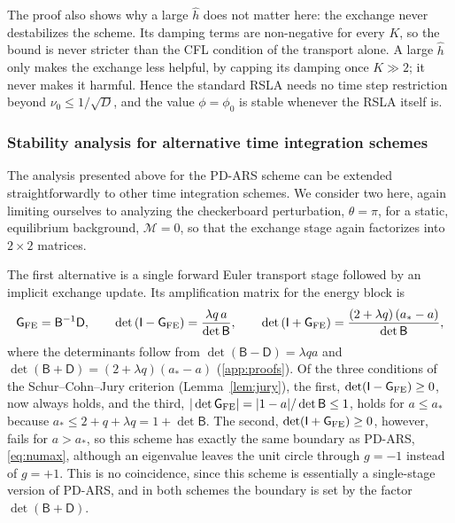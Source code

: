 \documentclass[preprint,12pt,authoryear]{elsarticle}
\newcommand{\tenI}{\mathsf{I}}
\newcommand{\tenG}{\mathsf{G}}
\providecommand{\tenD}{\mathsf{D}}
\providecommand{\tenB}{\mathsf{B}}
\newcommand{\calM}{\mathcal{M}}
\begin{document}
The proof also shows why a large $\hat{h}$ does not matter here: the exchange never destabilizes the scheme. Its damping terms are non-negative for every $K$, so the bound is never stricter than the CFL condition of the transport alone. A large $\hat{h}$ only makes the exchange less helpful, by capping its damping once $K \gg 2$; it never makes it harmful. Hence the standard RSLA needs no time step restriction beyond $\nu_0 \leq 1/\sqrt{D}$, and the value $\phi = \phi_0$ is stable whenever the RSLA itself is.

\subsubsection{Stability analysis for alternative time integration schemes}
\label{sssec:other_schemes}

The analysis presented above for the PD-ARS scheme can be extended straightforwardly to other time integration schemes. We consider two here, again limiting ourselves to analyzing the checkerboard perturbation, $\theta=\pi$, for a static, equilibrium background, $\calM = 0$, so that the exchange stage again factorizes into $2\times2$ matrices.

The first alternative is a single forward Euler transport stage followed by an implicit exchange update. Its amplification matrix for the energy block is
\begin{equation}
    \tenG_{\rm FE} = \tenB^{-1}\tenD,
    \qquad
    \det\left(\tenI - \tenG_{\rm FE}\right) = \frac{\lambda q\,a}{\det\tenB},
    \qquad
    \det\left(\tenI + \tenG_{\rm FE}\right) = \frac{\left(2 + \lambda q\right)\left(a_* - a\right)}{\det\tenB},
    \label{eq:G_FE}
\end{equation}
where the determinants follow from $\det(\tenB - \tenD) = \lambda q a$ and $\det(\tenB + \tenD) = (2 + \lambda q)(a_* - a)$ (\ref{app:proofs}). Of the three conditions of the Schur--Cohn--Jury criterion (Lemma~\ref{lem:jury}), the first, $\det(\tenI - \tenG_{\rm FE}) \geq 0$, now always holds, and the third, $|\det\tenG_{\rm FE}| = |1 - a|/\det\tenB \leq 1$, holds for $a \leq a_*$ because $a_* \leq 2 + q + \lambda q = 1 + \det\tenB$. The second, $\det(\tenI + \tenG_{\rm FE}) \geq 0$, however, fails for $a > a_*$, so this scheme has exactly the same boundary as PD-ARS, \autoref{eq:numax}, although an eigenvalue leaves the unit circle through $g = -1$ instead of $g = +1$. This is no coincidence, since this scheme is essentially a single-stage version of PD-ARS, and in both schemes the boundary is set by the factor $\det(\tenB + \tenD)$.
\end{document}
